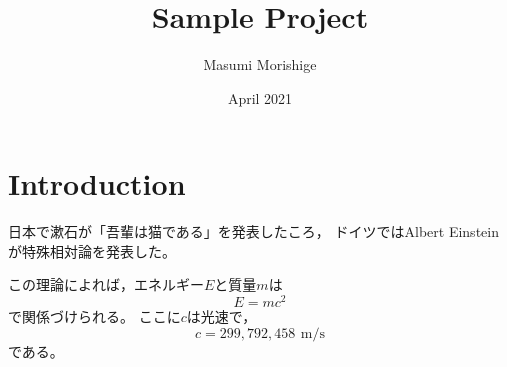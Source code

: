 \documentclass{article}
\title{Sample Project}
\author{Masumi Morishige}
\date{April 2021}
\begin{document}
\maketitle
\section{Introduction}

日本で漱石が「吾輩は猫である」を発表したころ，
ドイツではAlbert Einsteinが特殊相対論を発表した。

この理論によれば，エネルギー$E$と質量$m$は
\begin{equation}
  E = mc^{2}
\end{equation}
で関係づけられる。
ここに$c$は光速で，
\[
c = 299{,}792{,}458 \, \ \mathrm{m/s}
\]
である。
\end{document}
